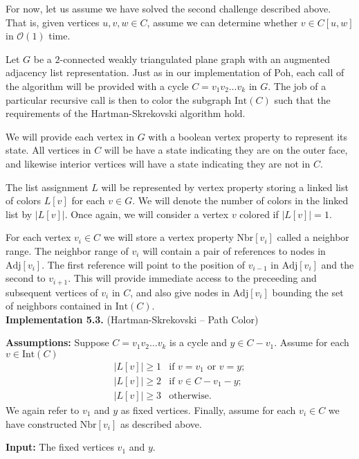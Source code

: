 \documentclass[letterpaper, 12pt]{article}
\theoremstyle{definition}
\theoremstyle{definition}
\theoremstyle{thm}
\theoremstyle{definition}
\begin{document}
For now, let us assume we have solved the second challenge described above. That
is, given vertices $u,v,w\in C$, assume we can determine whether $v\in C[u,w]$
in $\mathcal{O}(1)$ time.

Let $G$ be a $2$-connected weakly triangulated plane graph with an augmented
adjacency list representation.
Just as in our implementation of Poh, each call of the algorithm will be provided
with a cycle $C=v_1v_2\ldots v_k$ in $G$. The job of a particular recursive call
is then to color the subgraph $\text{Int}(C)$ such that the requirements of the
Hartman-Skrekovski algorithm hold.

We will provide each vertex in $G$ with a boolean vertex
property to represent its state. All vertices in $C$ will be have a state indicating
they are on the outer face, and likewise interior vertices will have a state
indicating they are not in $C$.

The list assignment $L$ will be represented by vertex property storing a linked
list of colors $L[v]$ for each $v\in G$. We will denote the number of colors
in the linked list by $|L[v]|$. Once again, we will consider a vertex $v$
colored if $|L[v]|=1$.

For each vertex $v_i\in C$ we will store a vertex property $\text{Nbr}[v_i]$
called a neighbor range. The neighbor range of $v_i$ will contain a pair of
references to nodes in $\text{Adj}[v_i]$. The first reference will point to the
position of $v_{i-1}$ in $\text{Adj}[v_i]$ and the second to $v_{i+1}$. This
will provide immediate access to the preceeding and subsequent vertices of $v_i$
in $C$, and also give nodes in $\text{Adj}[v_i]$ bounding the set of neighbors
contained in $\text{Int}(C)$.\\

\noindent\textbf{Implementation 5.3.} (Hartman-Skrekovski -- Path Color)

\noindent\textbf{Assumptions:} Suppose $C=v_1v_2\ldots v_k$ is a cycle and
$y\in C-v_1$. Assume for each $v\in \text{Int}(C)$
\[
    \begin{array}{ll}
	    |L[v]|\ge 1 & \text{if } v=v_1 \text{ or } v=y;\\
	    |L[v]|\ge 2 & \text{if } v\in C-v_1-y;\\
	    |L[v]|\ge 3 & \text{otherwise.}
    \end{array}
\]
We again refer to $v_1$ and $y$ as fixed vertices. Finally, assume for
each $v_i\in C$ we have constructed $\text{Nbr}[v_i]$ as described above.

\noindent\textbf{Input:} The fixed vertices $v_1$ and $y$.
\end{document}
